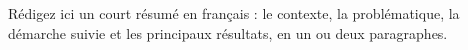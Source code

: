 Rédigez ici un court résumé en français : le contexte, la problématique, la
démarche suivie et les principaux résultats, en un ou deux paragraphes.
